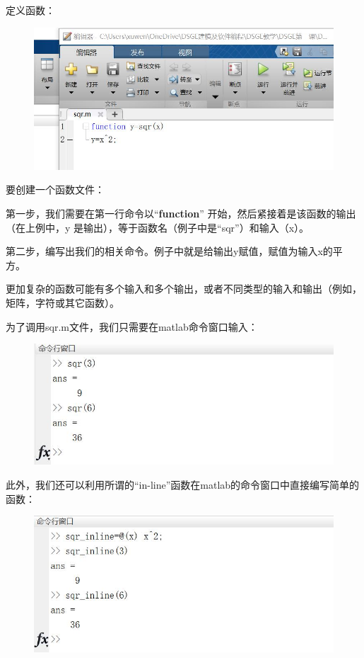 \documentclass[10pt,math=newtx,citestyle=gb7714-2015,bibstyle=gb7714-2015]{elegantbook}
\begin{document}
{{{	定义函数：
	\begin{figure}[htbp!]
		\centering
		\includegraphics[width=0.8\linewidth]{FIG/function1}
		\centering
	\end{figure}
	
	要创建一个函数文件：
	
	第一步，我们需要在第一行命令以“\textbf{function}” 开始，然后紧接着是该函数的输出（在上例中，y 是输出），等于函数名（例子中是“sqr”）和输入（x）。
	
	第二步，编写出我们的相关命令。例子中就是给输出y赋值，赋值为输入x的平方。
	
	更加复杂的函数可能有多个输入和多个输出，或者不同类型的输入和输出（例如，矩阵，字符或其它函数）。
	
	为了调用sqr.m文件，我们只需要在matlab命令窗口输入：
	
	\begin{figure}[htbp!]
		\centering
		\includegraphics[width=0.8\linewidth]{FIG/sqr}
		\centering
	\end{figure}
	
	此外，我们还可以利用所谓的“in-line”函数在matlab的命令窗口中直接编写简单的函数：
	\begin{figure}[htbp!]
		\centering
		\includegraphics[width=0.8\linewidth]{FIG/inlinefunction}
		\centering
	\end{figure}
	
}}}
\end{document}
